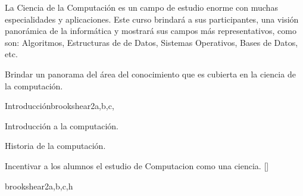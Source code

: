 \begin{syllabus}


\begin{justification}
La Ciencia de la Computación es un campo de estudio enorme con muchas especialidades y aplicaciones. Este curso brindará a sus participantes, una visión panorámica de la informática y mostrará sus campos más representativos, como son: Algoritmos, Estructuras de de Datos, Sistemas Operativos, Bases de Datos, etc.
\end{justification}

\begin{goals}
\item Brindar un panorama del área del conocimiento que es cubierta en la ciencia de la computación.
\end{goals}


\begin{unit}{Introducción}{}{brookshear}{2}{a,b,c,}
    \begin{topics}
	\item Introducción a la computación.
	\item Historia de la computación.
   \end{topics}
   \begin{learningoutcomes}
      \item Incentivar a los alumnos el estudio de Computacion como una ciencia. [\Familiarity]
   \end{learningoutcomes}
\end{unit}

\begin{unit}{\DSBasicLogic}{}{brookshear}{2}{a,b,c,h}
   \begin{topics}
      \item \DSBasicLogicTopicPropositional
      \item \DSBasicLogicTopicLogical
      \item \DSBasicLogicTopicTruth
      \item \DSBasicLogicTopicNormal
   \end{topics}
   \begin{learningoutcomes}
      \item \DSBasicLogicLOConvertLogical[\Familiarity]
      \item \DSBasicLogicLOApplyFormal [\Familiarity]
   \end{learningoutcomes}
\end{unit}

\begin{coursebibliography}
\end{coursebibliography}
\end{syllabus}
%
